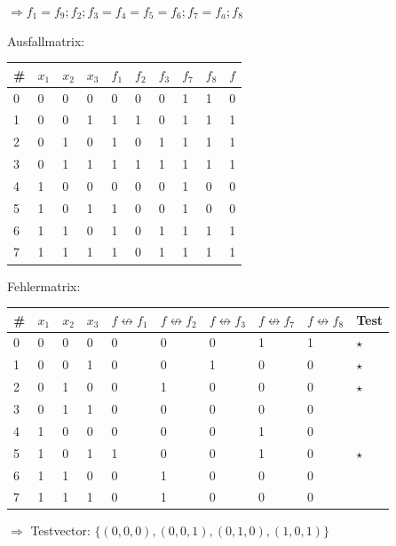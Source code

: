 \documentclass[10pt,a4paper]{scrartcl}
\begin{document}
$\Longrightarrow f_1=f_9 ; f_2 ; f_3=f_4=f_5=f_6 ; f_7=f_a ; f_8$

Ausfallmatrix:
\begin{tabular}{|l||lll||l|l|l|l|l||l|}\hline
\# & $x_1$&$x_2$&$x_3$&$f_1$&$f_2$&$f_3$&$f_7$&$f_8$&$f$ \\\hline\hline
0  & 0&0&0            & 0   & 0   & 0   & 1   & 1   & 0  \\
1  & 0&0&1            & 1   & 1   & 0   & 1   & 1   & 1  \\
2  & 0&1&0            & 1   & 0   & 1   & 1   & 1   & 1  \\
3  & 0&1&1            & 1   & 1   & 1   & 1   & 1   & 1  \\
4  & 1&0&0            & 0   & 0   & 0   & 1   & 0   & 0  \\
5  & 1&0&1            & 1   & 0   & 0   & 1   & 0   & 0  \\
6  & 1&1&0            & 1   & 0   & 1   & 1   & 1   & 1  \\
7  & 1&1&1            & 1   & 0   & 1   & 1   & 1   & 1  \\\hline
\end{tabular}

Fehlermatrix:
\begin{tabular}{|l||lll||l|l|l|l|l||l|}\hline
\# & $x_1$&$x_2$&$x_3$&$f\nleftrightarrow f_1$&$f\nleftrightarrow f_2$&$f\nleftrightarrow f_3$&$f\nleftrightarrow f_7$&$f\nleftrightarrow f_8$ & Test\\\hline\hline
0  & 0&0&0            & 0   & 0   & 0   & 1   & 1 & $\star$ \\
1  & 0&0&1            & 0   & 0   & 1   & 0   & 0 & $\star$ \\
2  & 0&1&0            & 0   & 1   & 0   & 0   & 0 & $\star$ \\
3  & 0&1&1            & 0   & 0   & 0   & 0   & 0 & \\
4  & 1&0&0            & 0   & 0   & 0   & 1   & 0 & \\
5  & 1&0&1            & 1   & 0   & 0   & 1   & 0 & $\star$ \\
6  & 1&1&0            & 0   & 1   & 0   & 0   & 0 & \\
7  & 1&1&1            & 0   & 1   & 0   & 0   & 0 & \\\hline
\end{tabular}

$\Longrightarrow$ Testvector: $\{(0,0,0),(0,0,1),(0,1,0),(1,0,1)\}$

\FloatBarrier
\end{document}

